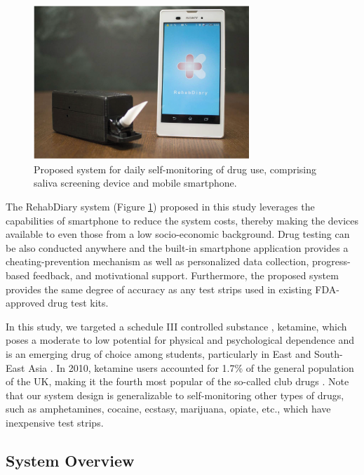 \begin{figure}[ht]
\begin{center}
\includegraphics[height=5.8cm]{image/ket/concept_photo.eps}
\caption{Proposed system for daily self-monitoring of drug use, comprising saliva screening device and mobile smartphone.}
\label{fig:overview_photo}
\end{center}
\end{figure}

The RehabDiary system (Figure \ref{fig:overview_photo}) proposed in this study leverages the capabilities of smartphone to reduce the system costs, thereby making the devices available to even those from a low socio-economic background. Drug testing can be also conducted anywhere and the built-in smartphone application provides a cheating-prevention mechanism as well as personalized data collection, progress-based feedback, and motivational support.  Furthermore, the proposed system provides the same degree of accuracy as any test strips used in existing FDA-approved drug test kits.

In this study, we targeted a schedule III controlled substance \cite{ketamine_schedule_III}, ketamine, which poses a moderate to low potential for physical and psychological dependence and is an emerging drug of choice among students, particularly in East and South-East Asia \cite{WorldDrugReport}. In 2010, ketamine users accounted for 1.7\% of the general population of the UK, making it the fourth most popular of the so-called club drugs \cite{Morgan2012}. Note that our system design is generalizable to self-monitoring other types of drugs, such as amphetamines, cocaine, ecstasy, marijuana, opiate, etc., which have inexpensive test strips.


\subsection{System Overview}


